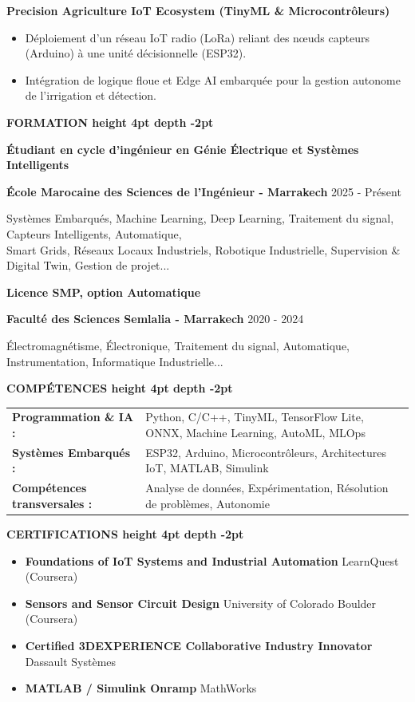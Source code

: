 \documentclass[10pt,a4paper]{altacv}
\renewcommand{\cvsection}[2][]{%
  \vspace{3pt}%
  {\color{heading}\LARGE\bfseries #2 \hspace{0.2em}\leaders\vrule height 4pt depth -2pt\hfill\mbox{}}\par\vspace{2pt}
}
\renewcommand{\cvevent}[4]{%
  {\large\bfseries\color{accent}#1\par}
  \vspace{1pt}\normalsize
  \ifstrequal{#2}{}{}{%
    \textbf{\color{emphasis}#2\ifstrequal{#4}{}{}{ - #4}}%
  }%
  \hfill
  \ifstrequal{#3}{}{}{{\small#3}}%
  \par\vspace{1pt}
}
\begin{document}
{\large\bfseries\color{accent} Precision Agriculture IoT Ecosystem (TinyML \& Microcontrôleurs)}\\[0.05cm]
\begin{itemize}
  \item Déploiement d'un réseau IoT radio (LoRa) reliant des nœuds capteurs (Arduino) à une unité décisionnelle (ESP32).
  \item Intégration de logique floue et Edge AI embarquée pour la gestion autonome de l'irrigation et détection.
\end{itemize}

\cvsection{FORMATION}
\cvevent{Étudiant en cycle d'ingénieur en Génie Électrique et Systèmes Intelligents}{École Marocaine des Sciences de l'Ingénieur}{2025 - Présent}{Marrakech}
\small Systèmes Embarqués, Machine Learning, Deep Learning, Traitement du signal, Capteurs Intelligents, Automatique,\\
\small Smart Grids, Réseaux Locaux Industriels, Robotique Industrielle, Supervision \& Digital Twin, Gestion de projet...

\cvevent{Licence SMP, option Automatique}{Faculté des Sciences Semlalia}{2020 - 2024}{Marrakech}
\small Électromagnétisme, Électronique, Traitement du signal, Automatique, Instrumentation, Informatique Industrielle...

\cvsection{COMPÉTENCES}
\begin{tabular}{@{}ll@{}}
\textbf{Programmation \& IA :} & Python, C/C++, TinyML, TensorFlow Lite, ONNX, Machine Learning, AutoML, MLOps \\[2pt]
\textbf{Systèmes Embarqués :} & ESP32, Arduino, Microcontrôleurs, Architectures IoT, MATLAB, Simulink \\[2pt]
\textbf{Compétences transversales :} & Analyse de données, Expérimentation, Résolution de problèmes, Autonomie \\
\end{tabular}

\cvsection{CERTIFICATIONS}
\begin{itemize}[leftmargin=*, label=\textbullet, itemsep=2pt]
  \item \textbf{Foundations of IoT Systems and Industrial Automation} \hfill {\color{emphasis}LearnQuest (Coursera)}
  \item \textbf{Sensors and Sensor Circuit Design} \hfill {\color{emphasis}University of Colorado Boulder (Coursera)}
  \item \textbf{Certified 3DEXPERIENCE Collaborative Industry Innovator} \hfill {\color{emphasis}Dassault Systèmes}
  \item \textbf{MATLAB / Simulink Onramp} \hfill {\color{emphasis}MathWorks}
\end{itemize}
\end{document}
